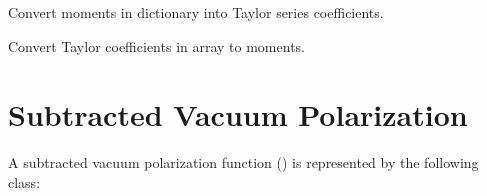 \documentclass[letterpaper,10pt,english]{sphinxmanual}
\begin{document}

\begin{fulllineitems}
\label{g2tools:g2tools.mom2taylor}
Convert moments in dictionary  into Taylor series coefficients.

\end{fulllineitems}


\begin{fulllineitems}
\label{g2tools:g2tools.taylor2mom}
Convert Taylor coefficients in array  to moments.

\end{fulllineitems}



\section{Subtracted Vacuum Polarization}
\label{g2tools:subtracted-vacuum-polarization}
A subtracted vacuum polarization function () is
represented by the following class:
\end{document}
